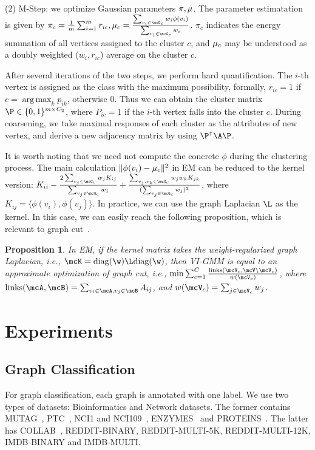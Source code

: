 \documentclass[letterpaper]{article} \usepackage{aaai19}  \usepackage{times}  \usepackage{helvet}  \usepackage{courier}  \usepackage{url}  \usepackage{graphicx}  \frenchspacing  \setlength{\pdfpagewidth}{8.5in}  \setlength{\pdfpageheight}{11in}
\DeclareMathOperator*{\argmax}{arg\,max}
\def\tp{^\intercal} \def\st{\text{s.t.~}}
\def\ie{{i.e.}} \def\etal{{et.al}}
\newtheorem{prop}{Proposition}
\begin{document}
(2) {M-Step}: we optimize Gaussian parameters $\pi, \mathbf{\mu}$. The parameter estimatation is given by $
\pi_c = \frac{1}{m}\sum_{i=1}^m r_{ic},
\bmu_c =\frac{\sum_{v_i\in \mcG_c}w_i\phi(v_i)}{\sum_{v_i\in \mcG_c}w_i}$.
$\pi_c$ indicates the energy summation of all vertices assigned to the cluster $c$, and $\mathbf{\mu}_c$ may be understood as a doubly weighted ($w_i, r_{ic}$) average on the cluster $c$.

After several iterations of the two steps, we perform hard quantification. The $i$-th vertex is assigned as the class with the maximum possibility, formally, $r_{ic} = 1$ if $c=\argmax_{k} p_{ik}$, otherwise 0. Thus we can obtain the cluster matrix $\P\in\{0,1\}^{m\times C_2}$, where $P_{ic}=1$ if the $i$-th vertex falls into the cluster $c$. During coarsening, we take maximal responses of each cluster as the attributes of new vertex, and derive a new adjacency matrix by using $\P\tp\A\P$.

It is worth noting that we need not compute the concrete $\phi$ during the clustering process. The main calculation $\|\phi(v_i)-\mathbf{\mu}_c\|^2$ in EM can be reduced to the kernel version:
$K_{ii}-\frac{2\sum_{v_j\in\mcG_c}w_jK_{ij}}{\sum_{v_j\in\mcG_c}w_j}
+\frac{\sum_{v_j,v_k\in\mcG_c}w_jw_k K_{jk}}{(\sum_{v_j\in\mcG_c}w_j)^2}$,
where $K_{ij} = \langle\phi(v_i),\phi(v_j)\rangle$.
In practice, we can use the graph Laplacian $\L$ as the kernel. In this case, we can easily reach the following proposition, which is relevant to graph cut~\cite{dhillon2007weighted}.
\begin{prop}
	In EM, if the kernel matrix takes the weight-regularized graph Laplacian, \ie, $\mcK= \text{diag}(\w)\L \text{diag}(\w)$, then VI-GMM is equal to an approximate optimization of graph cut, \ie, $
	\min \sum_{c=1}^C\frac{\text{links}(\mcV_c, \mcV\backslash \mcV_c)}{w(\mcV_c)}$,
	where $\text{links}(\mcA, \mcB)=\sum_{v_i\in\mcA,v_j\in\mcB} A_{ij}$, and $w(\mcV_c)=\sum_{j\in\mcV_c}w_j$.
\end{prop}


\section{Experiments}

\subsection{Graph Classification}

For graph classification, each graph is annotated with one label. We use two types of datasets: Bioinformatics and Network datasets. The former contains MUTAG~\cite{debnath1991structure}, PTC~\cite{toivonen2003statistical}, NCI1 and NCI109~\cite{wale2008comparison}, ENZYMES~\cite{borgwardt2005protein} and PROTEINS~\cite{borgwardt2005protein}. The latter has COLLAB~\cite{leskovec2005graphs}, REDDIT-BINARY, REDDIT-MULTI-5K, REDDIT-MULTI-12K, IMDB-BINARY and IMDB-MULTI.
\end{document}
